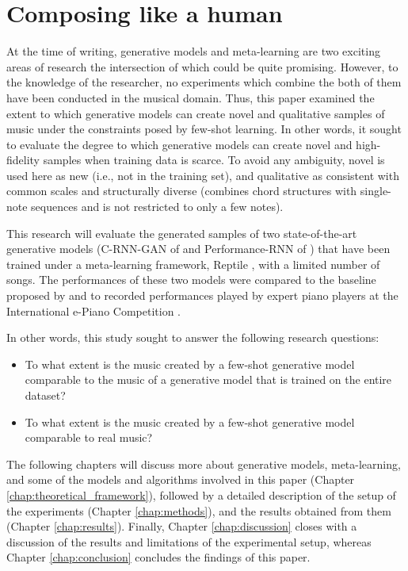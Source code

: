 \documentclass[a4paper]{book}
\begin{document}
\section{Composing like a human} \label{sec:thesis_goal}

At the time of writing, generative models and meta-learning are two exciting areas of research the intersection of which could be quite promising. However, to the knowledge of the researcher, no experiments which combine the both of them have been conducted in the musical domain. Thus, this paper examined the extent to which generative models can create novel and qualitative samples of music under the constraints posed by few-shot learning. In other words, it sought to evaluate the degree to which generative models can create novel and high-fidelity samples when training data is scarce. To avoid any ambiguity, novel is used here as new (i.e., not in the training set), and qualitative as consistent with common scales and structurally diverse (combines chord structures with single-note sequences and is not restricted to only a few notes).

This research will evaluate the generated samples of two state-of-the-art generative models (C-RNN-GAN of \cite{mogren_c-rnn-gan_2016} and Performance-RNN of \cite{oore_this_2018}) that have been trained under a meta-learning framework, Reptile \parencite{nichol_first-order_2018}, with a limited number of songs. The performances of these two models were compared to the baseline proposed by \textcite{larochelle_few-shot_2017} and to recorded performances played by expert piano players at the International e-Piano Competition \parencite{university_of_minnesota_international_2019}.

In other words, this study sought to answer the following research questions:

\begin{itemize}
    \item To what extent is the music created by a few-shot generative model comparable to the music of a generative model that is trained on the entire dataset?
    \item To what extent is the music created by a few-shot generative model comparable to real music?
\end{itemize}

The following chapters will discuss more about generative models, meta-learning, and some of the models and algorithms involved in this paper (Chapter \ref{chap:theoretical_framework}), followed by a detailed description of the setup of the experiments (Chapter \ref{chap:methods}), and the results obtained from them (Chapter \ref{chap:results}). Finally, Chapter \ref{chap:discussion} closes with a discussion of the results and limitations of the experimental setup, whereas Chapter \ref{chap:conclusion} concludes the findings of this paper.
\end{document}
